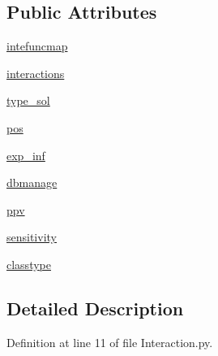 \subsection*{\-Public \-Attributes}
\begin{DoxyCompactItemize}
\item 
\hyperlink{classirna_1_1iRNA__stat_1_1Interaction_1_1Interaction_a631166a08b91ad1070330bf011e73ec0}{intefuncmap}
\item 
\hyperlink{classirna_1_1iRNA__stat_1_1Interaction_1_1Interaction_abd000211e93edd4aa942ccc3c4e816e1}{interactions}
\item 
\hyperlink{classirna_1_1iRNA__stat_1_1Interaction_1_1Interaction_a6869e0804e15e045070a215e2bf58f24}{type\-\_\-sol}
\item 
\hyperlink{classirna_1_1iRNA__stat_1_1Interaction_1_1Interaction_a17b9cfe084bf759cc911770733454249}{pos}
\item 
\hyperlink{classirna_1_1iRNA__stat_1_1Interaction_1_1Interaction_ad1d33b06b1df981d4110242a948d0757}{exp\-\_\-inf}
\item 
\hyperlink{classirna_1_1iRNA__stat_1_1Interaction_1_1Interaction_a185a31d807b0461a1f1f313b59efcdef}{dbmanage}
\item 
\hyperlink{classirna_1_1iRNA__stat_1_1Interaction_1_1Interaction_ad76df719016be0d2250d42eef707814d}{ppv}
\item 
\hyperlink{classirna_1_1iRNA__stat_1_1Interaction_1_1Interaction_a88b54f92134180d498ce915f367c1fa3}{sensitivity}
\item 
\hyperlink{classirna_1_1iRNA__stat_1_1Interaction_1_1Interaction_aca82307a2b96f84a0202c648f05d59cb}{classtype}
\end{DoxyCompactItemize}


\subsection{\-Detailed \-Description}


\-Definition at line 11 of file \-Interaction.\-py.



